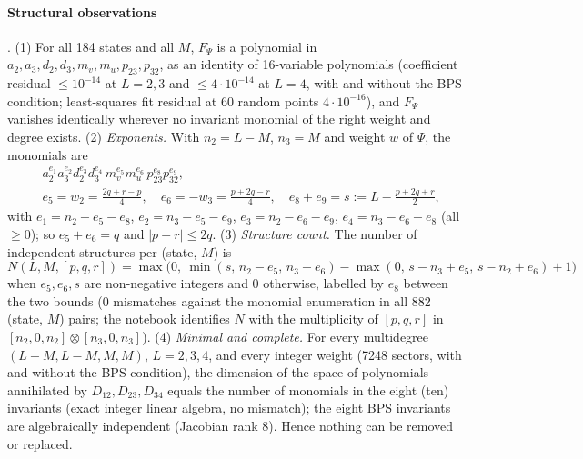 \paragraph{Structural observations} \npy. (1) For all 184 states and all $M$, $F_\Psi$ is a polynomial in $a_2,a_3,d_2,d_3,m_v,m_u,p_{23},p_{32}$, as an identity of 16-variable polynomials
(coefficient residual $\le10^{-14}$ at $L=2,3$ and $\le4\cdot10^{-14}$ at $L=4$, with and without the BPS condition; least-squares fit residual at 60 random points $4\cdot10^{-16}$), and $F_\Psi$ vanishes identically wherever no invariant monomial of the right weight and degree exists.
(2) \emph{Exponents.} With $n_2=L-M$, $n_3=M$ and weight $w$ of $\Psi$, the monomials are
\begin{align}
 &a_2^{e_1}a_3^{e_2}d_2^{e_3}d_3^{e_4}\,m_v^{e_5}m_u^{e_6}\,p_{23}^{e_8}p_{32}^{e_9},\nonumber\\
 &e_5=w_2=\frac{2q+r-p}4,\quad e_6=-w_3=\frac{p+2q-r}4,\quad e_8+e_9=s:=L-\frac{p+2q+r}2,
\end{align}
with $e_1=n_2-e_5-e_8$, $e_2=n_3-e_5-e_9$, $e_3=n_2-e_6-e_9$, $e_4=n_3-e_6-e_8$ (all $\ge0$); so $e_5+e_6=q$ and $|p-r|\le2q$.
(3) \emph{Structure count.} The number of independent structures per (state, $M$) is
\begin{equation}
 N(L,M,[p,q,r])=\max\Big(0,\ \min(s,\,n_2-e_5,\,n_3-e_6)-\max(0,\,s-n_3+e_5,\,s-n_2+e_6)+1\Big)
\end{equation}
when $e_5,e_6,s$ are non-negative integers and $0$ otherwise, labelled by $e_8$ between the two bounds (0 mismatches against the monomial enumeration in all 882 (state, $M$) pairs; the notebook identifies $N$ with the multiplicity of $[p,q,r]$ in
$[n_2,0,n_2]\otimes[n_3,0,n_3]$). (4) \emph{Minimal and complete.} For every multidegree $(L-M,L-M,M,M)$, $L=2,3,4$, and every integer weight (7248 sectors, with and without the BPS condition), the dimension of the space of polynomials annihilated by
$D_{12},D_{23},D_{34}$ equals the number of monomials in the eight (ten) invariants (exact integer linear algebra, no mismatch); the eight BPS invariants are algebraically independent (Jacobian rank 8). Hence nothing can be removed or replaced.

